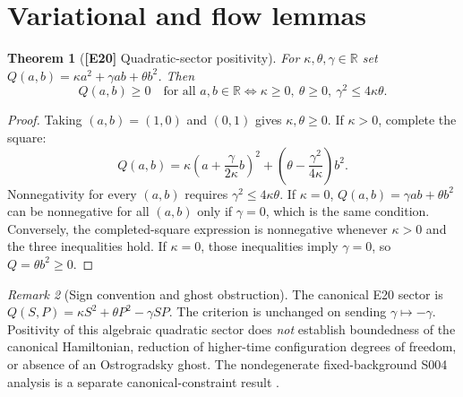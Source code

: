 \documentclass[11pt,letterpaper]{article}
\newtheorem{theorem}{Theorem}[section]
\theoremstyle{definition}
\theoremstyle{remark}
\newtheorem{remark}[theorem]{Remark}
\newcommand{\R}{\mathbb R}
\newcommand{\id}[1]{\textnormal{\textbf{[#1]}}}
\begin{document}
\section{Variational and flow lemmas}
\begin{theorem}[\id{E20} Quadratic-sector positivity]\label{thm:quad}
For $\kappa,\theta,\gamma\in\R$ set
$Q(a,b)=\kappa a^2+\gamma ab+\theta b^2$. Then
\begin{equation}\label{eq:quad}
\boxed{Q(a,b)\ge0\quad\text{for all }a,b\in\R
\iff\kappa\ge0,\ \theta\ge0,\ \gamma^2\le4\kappa\theta}.
\end{equation}
\end{theorem}
\begin{proof}
Taking $(a,b)=(1,0)$ and $(0,1)$ gives $\kappa,\theta\ge0$.
If $\kappa>0$, complete the square:
\begin{equation*}
Q(a,b)=\kappa\left(a+\frac\gamma{2\kappa}b\right)^2
+\left(\theta-\frac{\gamma^2}{4\kappa}\right)b^2.
\end{equation*}
Nonnegativity for every $(a,b)$ requires $\gamma^2\le4\kappa\theta$.
If $\kappa=0$, $Q(a,b)=\gamma ab+\theta b^2$ can be nonnegative for
all $(a,b)$ only if $\gamma=0$, which is the same condition.
Conversely, the completed-square expression is nonnegative whenever
$\kappa>0$ and the three inequalities hold. If $\kappa=0$, those
inequalities imply $\gamma=0$, so $Q=\theta b^2\ge0$.
\end{proof}
\begin{remark}[Sign convention and ghost obstruction]
The canonical E20 sector is
$Q(S,P)=\kappa S^2+\theta P^2-\gamma SP$.
The criterion is unchanged on sending $\gamma\mapsto-\gamma$.
Positivity of this algebraic quadratic sector does \emph{not} establish
boundedness of the canonical Hamiltonian, reduction of higher-time
configuration degrees of freedom, or absence of an Ostrogradsky ghost.
The nondegenerate fixed-background S004 analysis is a separate
canonical-constraint result \cite{s004}.
\end{remark}
\end{document}
